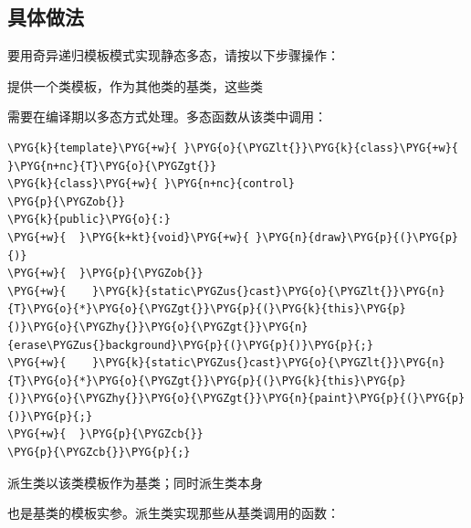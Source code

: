 
\subsection{具体做法}



要用奇异递归模板模式实现静态多态，请按以下步骤操作：



提供一个类模板，作为其他类的基类，这些类



需要在编译期以多态方式处理。多态函数从该类中调用：



\begin{codeblockbg}
\begin{Verbatim}[commandchars=\\\{\},breaklines=true,breakanywhere=true,fontsize=\codefont,xleftmargin=17bp]
\PYG{k}{template}\PYG{+w}{ }\PYG{o}{\PYGZlt{}}\PYG{k}{class}\PYG{+w}{ }\PYG{n+nc}{T}\PYG{o}{\PYGZgt{}}
\PYG{k}{class}\PYG{+w}{ }\PYG{n+nc}{control}
\PYG{p}{\PYGZob{}}
\PYG{k}{public}\PYG{o}{:}
\PYG{+w}{  }\PYG{k+kt}{void}\PYG{+w}{ }\PYG{n}{draw}\PYG{p}{(}\PYG{p}{)}
\PYG{+w}{  }\PYG{p}{\PYGZob{}}
\PYG{+w}{    }\PYG{k}{static\PYGZus{}cast}\PYG{o}{\PYGZlt{}}\PYG{n}{T}\PYG{o}{*}\PYG{o}{\PYGZgt{}}\PYG{p}{(}\PYG{k}{this}\PYG{p}{)}\PYG{o}{\PYGZhy{}}\PYG{o}{\PYGZgt{}}\PYG{n}{erase\PYGZus{}background}\PYG{p}{(}\PYG{p}{)}\PYG{p}{;}
\PYG{+w}{    }\PYG{k}{static\PYGZus{}cast}\PYG{o}{\PYGZlt{}}\PYG{n}{T}\PYG{o}{*}\PYG{o}{\PYGZgt{}}\PYG{p}{(}\PYG{k}{this}\PYG{p}{)}\PYG{o}{\PYGZhy{}}\PYG{o}{\PYGZgt{}}\PYG{n}{paint}\PYG{p}{(}\PYG{p}{)}\PYG{p}{;}
\PYG{+w}{  }\PYG{p}{\PYGZcb{}}
\PYG{p}{\PYGZcb{}}\PYG{p}{;}
\end{Verbatim}
\end{codeblockbg}



派生类以该类模板作为基类；同时派生类本身



也是基类的模板实参。派生类实现那些从基类调用的函数：



